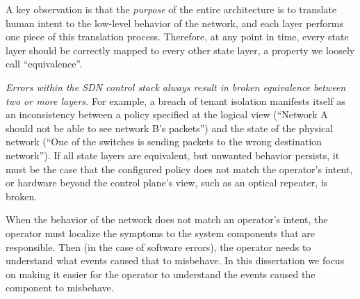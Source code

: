 
A key observation is that the {\em purpose} of the entire architecture is to translate human intent to
the low-level behavior of the network, and each layer performs one piece of this
translation process. Therefore, at any point in time, every state layer should be
correctly mapped to every other state layer, a property we loosely call ``equivalence''.

\emph{Errors within the SDN control stack always result in broken equivalence between two or more layers.} For example, a breach of tenant isolation manifests itself as an inconsistency between a policy specified at the logical
view (``Network A should not be able to see network B's packets'') and the state
of the physical network (``One of the switches is sending packets to the wrong destination network'').
If all state layers are equivalent, but unwanted behavior persists, it must be the case that
the configured policy does not match the operator's intent, or hardware beyond the control plane's view, such as an optical repeater, is broken.


When the behavior of the network does not match an operator's intent, the
operator must localize the symptoms to the system components that are
responsible. Then (in the case of software errors), the operator needs to
understand what events caused that to misbehave. In this dissertation we focus
on making it easier
for the operator to understand the events caused the component to misbehave.
